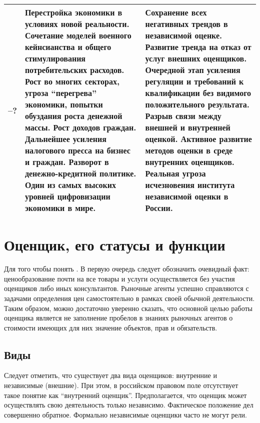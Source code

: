 \documentclass[12pt]{scrartcl}
\begin{document}
\begin{table}[h]
\begin{tabularx}{\textwidth}{>{\hsize=0.23\hsize}X >{\hsize=0.9\hsize}X X}
		2023--? & Перестройка экономики в условиях новой реальности. Сочетание моделей военного кейнсианства и общего стимулирования потребительских расходов. Рост во многих секторах, угроза ``перегрева'' экономики, попытки обуздания роста денежной массы. Рост доходов граждан. Дальнейшее усиления налогового пресса на бизнес и граждан. Разворот в денежно-кредитной политике. Один из самых высоких уровней цифровизации экономики в мире. & Сохранение всех негативных трендов в независимой оценке. Развитие тренда на отказ от услуг внешних оценщиков. Очередной этап усиления регуляции и требований к квалификации без видимого положительного результата. Разрыв связи между внешней и внутренней оценкой. Активное развитие методов оценки в среде внутренних оценщиков. Реальная угроза исчезновения института независимой оценки в России.\\
		\hline
	\end{tabularx}
    \normalsize
\end{table}

\section{Оценщик, его статусы и функции}\label{sec:appraiser}
Для того чтобы понять . В первую очередь следует обозначить очевидный факт: ценообразование почти на все товары и услуги осуществляется без участия оценщиков либо иных консультантов. Рыночные агенты успешно справляются с задачами определения цен самостоятельно в рамках своей обычной деятельности. Таким образом, можно достаточно уверенно сказать, что основной целью работы оценщика является не заполнение пробелов в знаниях рыночных агентов о стоимости имеющих для них значение объектов, прав и обязательств.

\subsection{Виды}
Следует отметить, что существует два вида оценщиков: внутренние и независимые (внешние). При этом, в российском правовом поле отсутствует такое понятие как ``внутренний оценщик''. Предполагается, что оценщик может осуществлять свою деятельность только независимо. Фактическое положение дел совершенно обратное. Формально независимые оценщики часто не могут рели.
\end{document}
